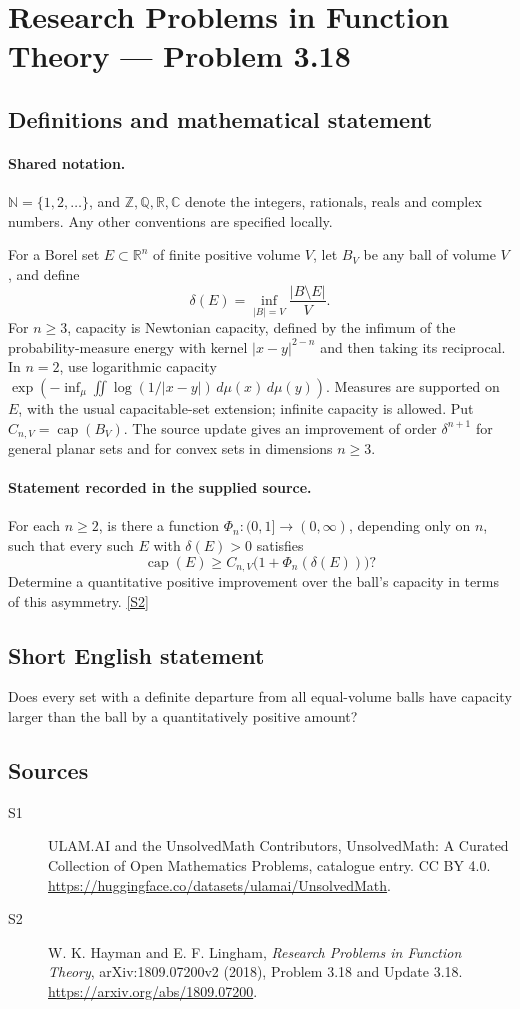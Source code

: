 \documentclass[11pt]{article}
\newcommand{\sref}[2]{\hyperlink{source:#1:#2}{[S#2]}}
\begin{document}
\section{Research Problems in Function Theory — Problem 3.18}\label{statement}

\subsection{Definitions and mathematical statement}

\paragraph{Shared notation.}$\mathbb N=\{1,2,\ldots\}$, and $\mathbb Z,\mathbb Q,\mathbb R,\mathbb C$ denote the integers, rationals, reals and complex numbers. Any other conventions are specified locally.


For a Borel set $E\subset\mathbb R^n$ of finite positive volume $V$, let $B_V$ be any ball of volume $V$, and define
\[\delta(E)=\inf_{|B|=V}\frac{|B\setminus E|}{V}.\]
For $n\geq3$, capacity is Newtonian capacity, defined by the infimum of the probability-measure energy with kernel $|x-y|^{2-n}$ and then taking its reciprocal. In $n=2$, use logarithmic capacity $\exp(-\inf_\mu\iint\log(1/|x-y|)\,d\mu(x)\,d\mu(y))$. Measures are supported on $E$, with the usual capacitable-set extension; infinite capacity is allowed. Put $C_{n,V}=\operatorname{cap}(B_V)$.
The source update gives an improvement of order $\delta^{n+1}$ for general planar sets and for convex sets in dimensions $n\geq3$.
\paragraph{Statement recorded in the supplied source.}
For each $n\geq2$, is there a function $\Phi_n:(0,1]\to(0,\infty)$, depending only on $n$, such that every such $E$ with $\delta(E)>0$ satisfies
\[\operatorname{cap}(E)\geq C_{n,V}\bigl(1+\Phi_n(\delta(E))\bigr)?\]
Determine a quantitative positive improvement over the ball's capacity in terms of this asymmetry. \sref{statement}{2}
\subsection{Short English statement}
Does every set with a definite departure from all equal-volume balls have capacity larger than the ball by a quantitatively positive amount?
\subsection{Sources}
\begin{description}
\item[\hypertarget{source:statement:1}{S1}] ULAM.AI and the UnsolvedMath Contributors, UnsolvedMath: A Curated Collection of Open Mathematics Problems, catalogue entry. CC BY 4.0. \url{https://huggingface.co/datasets/ulamai/UnsolvedMath}.
\item[\hypertarget{source:statement:2}{S2}] W. K. Hayman and E. F. Lingham, \emph{Research Problems in Function Theory}, arXiv:1809.07200v2 (2018), Problem 3.18 and Update 3.18. \url{https://arxiv.org/abs/1809.07200}.
\end{description}
\label{end:statement}
\end{document}
